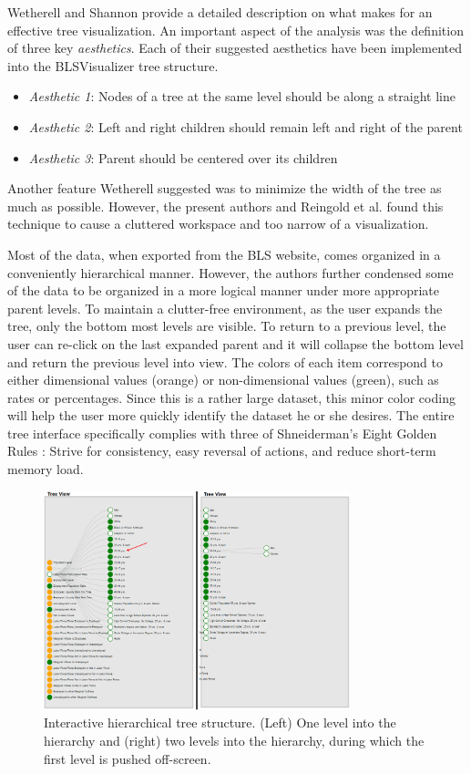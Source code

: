 \documentclass[journal]{IEEEtran}
\begin{document}
{Wetherell and Shannon \cite{Wetherell1979} provide a detailed description on what makes for an effective tree visualization. An important aspect of the analysis was the definition of three key \textit{aesthetics}. Each of their suggested aesthetics have been implemented into the BLSVisualizer tree structure.
\begin{itemize}
\item \textit{Aesthetic 1}: Nodes of a tree at the same level should be along a straight line
\item \textit{Aesthetic 2}: Left and right children should remain left and right of the parent
\item \textit{Aesthetic 3}: Parent should be centered over its children
\end{itemize}

Another feature Wetherell suggested was to minimize the width of the tree as much as possible. However, the present authors and Reingold et al. \cite{Reingold1981} found this technique to cause a cluttered workspace and too narrow of a visualization. 

Most of the data, when exported from the BLS website, comes organized in a conveniently hierarchical manner. However, the authors further condensed some of the data to be organized in a more logical manner under more appropriate parent levels. To maintain a clutter-free environment, as the user expands the tree, only the bottom most levels are visible. To return to a previous level, the user can re-click on the last expanded parent and it will collapse the bottom level and return the previous level into view. The colors of each item correspond to either dimensional values (orange) or non-dimensional values (green), such as rates or percentages. Since this is a rather large dataset, this minor color coding will help the user more quickly identify the dataset he or she desires. The entire tree interface specifically complies with three of Shneiderman's Eight Golden Rules \cite{shneiderman1986}: Strive for consistency, easy reversal of actions, and reduce short-term memory load. 

\begin{figure}[t]
\centering
    \includegraphics[width = 3.5in]{tree2.png}
    \caption{Interactive hierarchical tree structure. (Left) One level into the hierarchy and (right) two levels into the hierarchy, during which the first level is pushed off-screen.}
    \label{TreeStructure}
\end{figure}   

}
\end{document}

